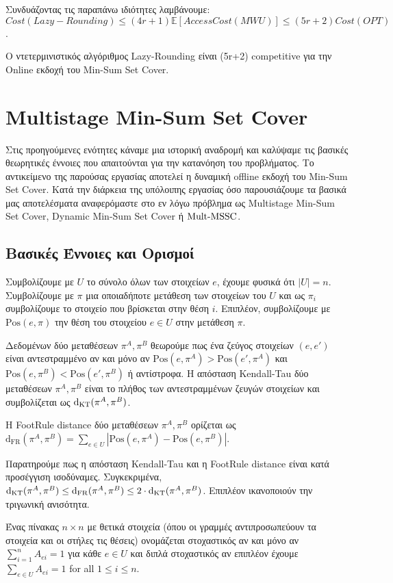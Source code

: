 Συνδυάζοντας τις παραπάνω ιδιότητες λαμβάνουμε: $$Cost(Lazy-Rounding) \leq (4r+1) \mathbb{E}[AccessCost(MWU)] \leq (5r+2) Cost(OPT)$$.

\begin{theorem}
    Ο ντετερμινιστικός αλγόριθμος Lazy-Rounding είναι (5r+2) competitive για την Online εκδοχή του Min-Sum Set Cover.
\end{theorem}

\section{Multistage Min-Sum Set Cover}

\noindent
Στις προηγούμενες ενότητες κάναμε μια ιστορική αναδρομή και καλύψαμε τις βασικές θεωρητικές έννοιες που απαιτούνται για την κατανόηση του προβλήματος. Το αντικείμενο της παρούσας εργασίας αποτελεί η δυναμική offline εκδοχή του Min-Sum Set Cover. Κατά την διάρκεια της υπόλοιπης εργασίας όσο παρουσιάζουμε τα βασικά μας αποτελέσματα αναφερόμαστε στο εν λόγω πρόβλημα ως Multistage Min-Sum Set Cover, Dynamic Min-Sum Set Cover ή $\mathrm{Mult}\text{-}\mathrm{MSSC}$. 

\subsection{Βασικές Έννοιες και Ορισμοί}

Συμβολίζουμε με $U$ το σύνολο όλων των στοιχείων $e$, έχουμε φυσικά ότι $|U| = n$. Συμβολίζουμε με $\pi$ μια οποιαδήποτε μετάθεση των στοιχείων του $U$ και ως $\pi_i$ συμβολίζουμε το στοιχείο που βρίσκεται στην θέση $i$. Επιπλέον, συμβολίζουμε με $\mathrm{Pos}( e, \pi )$ την θέση του στοιχείου $e \in U$ στην μετάθεση $\pi$.

\begin{ορισμός}\label{d:KT}
Δεδομένων δύο μεταθέσεων $\pi^A, \pi^B$ θεωρούμε πως ένα ζεύγος στοιχείων $(e,e')$ είναι αντεστραμμένο αν και μόνο αν $\mathrm{Pos}(e,\pi^A) > \mathrm{Pos}(e',\pi^A)$ και $\mathrm{Pos}(e,\pi^B) < \mathrm{Pos}(e',\pi^B)$ ή αντίστροφα. Η απόσταση Kendall-Tau δύο μεταθέσεων $\pi^A, \pi^B$ είναι το πλήθος των αντεστραμμένων ζευγών στοιχείων και συμβολίζεται ως $\mathrm{d}_{\mathrm{KT}}( \pi^A, \pi^B )$.
\end{ορισμός}

\begin{ορισμός}\label{d:FR}
Η FootRule distance δύο μεταθέσεων $\pi^A,\pi^B$ ορίζεται ως $\mathrm{d}_{\mathrm{FR}}(\pi^A,\pi^B) = \sum_{e \in U}|\mathrm{Pos}(e,\pi^A) - \mathrm{Pos}(e,\pi^B)|$.
\end{ορισμός}
\noindent Παρατηρούμε πως η απόσταση Kendall-Tau και η FootRule distance είναι κατά προσέγγιση ισοδύναμες. Συγκεκριμένα, $\mathrm{d}_{\mathrm{KT}}(\pi^A,\pi^B) \leq \mathrm{d}_{\mathrm{FR}}(\pi^A,\pi^B) \leq 2 \cdot \mathrm{d}_{\mathrm{KT}}(\pi^A,\pi^B)$. Επιπλέον ικανοποιούν την τριγωνική ανισότητα.
\begin{ορισμός} Ένας πίνακας $n \times n$ με θετικά στοιχεία (όπου οι γραμμές αντιπροσωπεύουν τα στοιχεία και οι στήλες τις θέσεις) ονομάζεται στοχαστικός αν και μόνο αν $\sum_{i = 1}^n A_{ei} = 1$ για κάθε $e\in U$ και διπλά στοχαστικός αν επιπλέον έχουμε $\sum_{e \in U} A_{ei}=1$ for all $1\leq i \leq n$.
\end{ορισμός}

